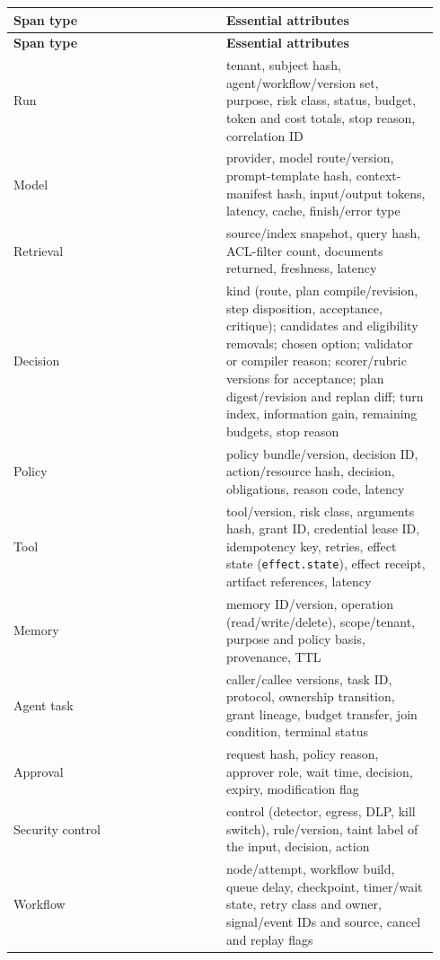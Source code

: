 \BookTableStart
\small
\begin{longtable}{@{}Y{0.4700\linewidth}Y{0.4700\linewidth}@{}}
\color{white}\bfseries \textbf{Span type} & \color{white}\bfseries \textbf{Essential attributes} \\
\endfirsthead
{}
\color{white}\bfseries \textbf{Span type} & \color{white}\bfseries \textbf{Essential attributes} \\
\endhead
Run & tenant, subject hash, agent/workflow/version set, purpose, risk class, status, budget, token and cost totals, stop reason, correlation ID \\
Model & provider, model route/version, prompt-template hash, context-manifest hash, input/output tokens, latency, cache, finish/error type \\
Retrieval & source/index snapshot, query hash, ACL-filter count, documents returned, freshness, latency \\
Decision & kind (route, plan compile/revision, step disposition, acceptance, critique); candidates and eligibility removals; chosen option; validator or compiler reason; scorer/rubric versions for acceptance; plan digest/revision and replan diff; turn index, information gain, remaining budgets, stop reason \\
Policy & policy bundle/version, decision ID, action/resource hash, decision, obligations, reason code, latency \\
Tool & tool/version, risk class, arguments hash, grant ID, credential lease ID, idempotency key, retries, effect state (\lstinline[style=bookinline]!effect.state!), effect receipt, artifact references, latency \\
Memory & memory ID/version, operation (read/write/delete), scope/tenant, purpose and policy basis, provenance, TTL \\
Agent task & caller/callee versions, task ID, protocol, ownership transition, grant lineage, budget transfer, join condition, terminal status \\
Approval & request hash, policy reason, approver role, wait time, decision, expiry, modification flag \\
Security control & control (detector, egress, DLP, kill switch), rule/version, taint label of the input, decision, action \\
Workflow & node/attempt, workflow build, queue delay, checkpoint, timer/wait state, retry class and owner, signal/event IDs and source, cancel and replay flags \\
\end{longtable}
\BookTableEnd

